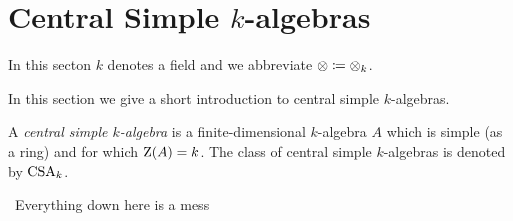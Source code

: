 \section{Central Simple \texorpdfstring{$k$}{k}-algebras}


\begin{conventions}
  In this secton $k$ denotes a field and we abbreviate $\otimes \coloneqq \otimes_k$.
\end{conventions}


\begin{fluff}
  In this section we give a short introduction to central simple $k$-algebras.
\end{fluff}


\begin{definition}
  A \emph{central simple $k$-algebra} is a finite-dimensional $k$-algebra $A$ which is simple (as a ring) and for which $\operatorname{Z}(A) = k$.
  The class of central simple $k$-algebras is denoted by $\operatorname{CSA}_k$.
\end{definition}













\noindent\hrulefill\, Everything down here is a mess \,\hrulefill




